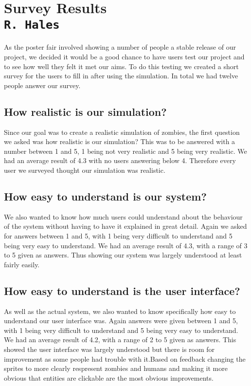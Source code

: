 \pagestyle{empty}
\section{Survey Results\\{\small\tt{R.~Hales}}}

As the poster fair involved showing a number of people a stable release of our project, we decided it would be a good chance to have users test our project and to see how well they felt it met our aims. To do this testing we created a short survey for the users to fill in after using the simulation.  In total we had twelve people answer our survey.

\subsection{How realistic is our simulation?}

Since our goal was to create a realistic simulation of zombies, the first question we asked was how realistic is our simulation? This was to be answered with a number between 1 and 5, 1 being not very realistic and 5 being very realistic. We had an average result of 4.3 with no users answering below 4. Therefore every user we surveyed thought our simulation was realistic.

\subsection{How easy to understand is our system?}

We also wanted to know how much users could understand about the behaviour of the system without having to have it explained in great detail. Again we asked for answers between 1 and 5, with 1 being very difficult to understand and 5 being very easy to understand. We had an average result of 4.3, with a range of 3 to 5 given as answers. Thus showing our system was largely understood at least fairly easily.

\subsection{How easy to understand is the user interface?}

As well as the actual system, we also wanted to know specifically how easy to understand our user interface was. Again answers were given between 1 and 5, with 1 being very difficult to understand and 5 being very easy to understand. We had an average result of 4.2, with a range of 2 to 5 given as answers. This showed the user interface was largely understood but there is room for improvement as some people had trouble with it.Based on feedback changing the sprites to more clearly respresent zombies and humans and making it more obvious that entities are clickable are the most obvious improvements.

